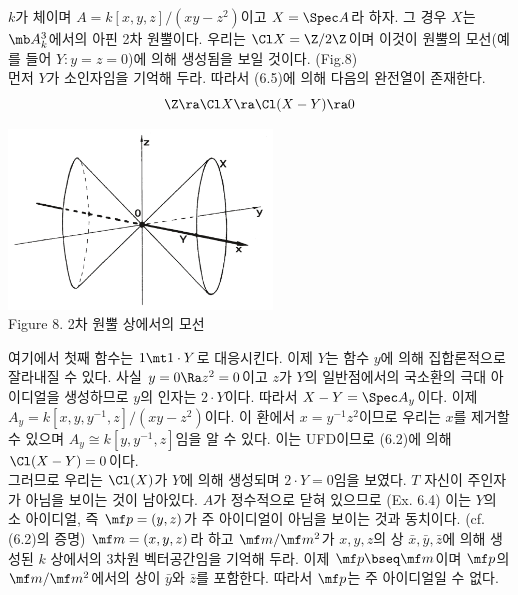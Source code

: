 	
	\begin{example}
	$k$가 체이며 $A=k[x,y,z]/(xy-z^2)$이고 $X=\Spec A$라 하자. 그 경우 $X$는 $\mb A_k^3$에서의 아핀 2차 원뿔이다.
	우리는 $\Cl X=\Z/2\Z$이며 이것이 원뿔의 모선(예를 들어 $Y:y=z=0$)에 의해 생성됨을 보일 것이다. (Fig.8)\\
	먼저 $Y$가 소인자임을 기억해 두라. 따라서 (6.5)에 의해 다음의 완전열이 존재한다.
	$$\Z\ra\Cl X\ra\Cl(X-Y)\ra 0$$
	\begin{center}
	\includegraphics[width=7cm]{Figure8}\\
	Figure 8. 2차 원뿔 상에서의 모선
	\end{center}
	여기에서 첫째 함수는 $1\mt 1\cdot Y$로 대응시킨다. 이제 $Y$는 함수 $y$에 의해 집합론적으로 잘라내질 수 있다.
	사실 $y=0\Ra z^2=0$이고 $z$가 $Y$의 일반점에서의 국소환의 극대 아이디얼을 생성하므로 $y$의 인자는 $2\cdot Y$이다.
	따라서 $X-Y=\Spec A_y$이다. 이제 $A_y=k[x,y,y^{-1},z]/(xy-z^2)$이다.
	이 환에서 $x=y^{-1}z^2$이므로 우리는 $x$를 제거할 수 있으며 $A_y\cong k[y,y^{-1},z]$임을 알 수 있다.
	이는 UFD이므로 (6.2)에 의해 $\Cl(X-Y)=0$이다.\\
	그러므로 우리는 $\Cl(X)$가 $Y$에 의해 생성되며 $2\cdot Y=0$임을 보였다. $T$ 자신이 주인자가 아님을 보이는 것이 남아있다.
	$A$가 정수적으로 닫혀 있으므로 (Ex. 6.4) 이는 $Y$의 소 아이디얼, 즉 $\mf p=(y,z)$가 주 아이디얼이 아님을 보이는 것과 동치이다.
	(cf. (6.2)의 증명) $\mf m=(x,y,z)$라 하고 $\mf m/\mf m^2$가 $x,y,z$의 상 $\bar x,\bar y,\bar z$에 의해 생성된
	$k$ 상에서의 3차원 벡터공간임을 기억해 두라.
	이제 $\mf p\bseq\mf m$이며 $\mf p$의 $\mf m/\mf m^2$에서의 상이 $\bar y$와 $\bar z$를 포함한다.
	따라서 $\mf p$는 주 아이디얼일 수 없다.
	\end{example}
	
